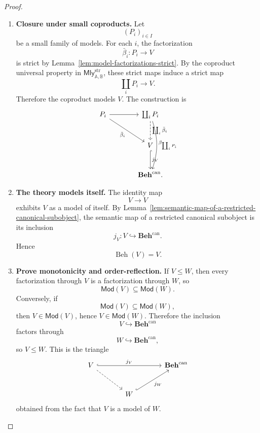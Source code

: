 \begin{proof}
\begin{enumerate}
        \item \textbf{Closure under small coproducts.}
        Let
        \[
            (P_i)_{i\in I}
        \]
        be a small family of models. For each \(i\), the factorization
        \[
            \bar\beta_i:P_i\to V
        \]
        is strict by Lemma~\ref{lem:model-factorizations-strict}. By the
        coproduct universal property in
        \(\mathsf{Mly}^{\mathrm{str}}_{\mathbb A,\mathbb B}\), these strict
        maps induce a strict map
        \[
            \coprod_iP_i\to V.
        \]
        Therefore the coproduct models \(V\). The construction is
        \[
        \begin{tikzcd}[column sep=large, row sep=large]
            P_i
                \arrow[r]
                \arrow[dr, "\bar\beta_i"']
            &
            \coprod_iP_i
                \arrow[d, dashed, "\coprod_i\bar\beta_i"]
                \arrow[dd, bend left=18, "\beta_{\coprod_iP_i}"]
            \\
            &
            V
                \arrow[d, hook, "j_V"]
            \\
            &
            \mathbf{Beh}^{\mathrm{can}} .
        \end{tikzcd}
        \]

        \item \textbf{The theory models itself.}
        The identity map
        \[
            V\to V
        \]
        exhibits \(V\) as a model of itself. By
        Lemma~\ref{lem:semantic-map-of-a-restricted-canonical-subobject}, the
        semantic map of a restricted canonical subobject is its inclusion
        \[
            j_V:V\hookrightarrow\mathbf{Beh}^{\mathrm{can}}.
        \]
        Hence
        \[
            \operatorname{Beh}(V)=V.
        \]

        \item \textbf{Prove monotonicity and order-reflection.}
        If \(V\leq W\), then every factorization through \(V\) is a
        factorization through \(W\), so
        \[
            \mathsf{Mod}(V)\subseteq\mathsf{Mod}(W).
        \]
        Conversely, if
        \[
            \mathsf{Mod}(V)\subseteq\mathsf{Mod}(W),
        \]
        then \(V\in\mathsf{Mod}(V)\), hence \(V\in\mathsf{Mod}(W)\). Therefore
        the inclusion
        \[
            V\hookrightarrow\mathbf{Beh}^{\mathrm{can}}
        \]
        factors through
        \[
            W\hookrightarrow\mathbf{Beh}^{\mathrm{can}},
        \]
        so \(V\leq W\). This is the triangle
        \[
        \begin{tikzcd}[column sep=large, row sep=large]
            V
                \arrow[rr, hook, "j_V"]
                \arrow[dr, dashed]
            &&
            \mathbf{Beh}^{\mathrm{can}}
            \\
            &
            W
                \arrow[ur, hook, "j_W"']
            &
        \end{tikzcd}
        \]
        obtained from the fact that \(V\) is a model of \(W\).
    \end{enumerate}
\end{proof}


